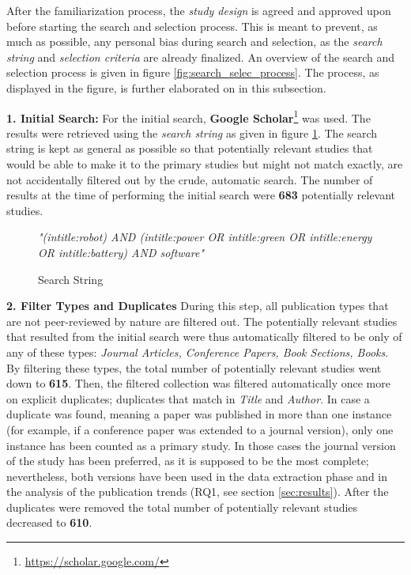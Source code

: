 After the familiarization process, the \textit{study design} is agreed and approved upon before starting the search and selection process. 
This is meant to prevent, as much as possible, any personal bias during search and selection, as the \textit{search string} and \textit{selection criteria} are already finalized.
An overview of the search and selection process is given in figure \ref{fig:search_selec_process}.
The process, as displayed in the figure, is further elaborated on in this subsection.

\vspace{5mm}

\noindent\textbf{1. Initial Search:}
For the initial search, \textbf{Google Scholar}\footnote{\url{https://scholar.google.com/}} was used. The results were retrieved using the \textit{search string} as given in figure \ref{fig:search_string}. 
The search string is kept as general as possible so that potentially relevant studies that would be able to make it to the primary studies but might not match exactly, are not accidentally filtered out by the crude, automatic search.
The number of results at the time of performing the initial search were \textbf{683} potentially relevant studies.

\begin{figure}
    \centering
    \textit{"(intitle:robot) AND (intitle:power OR intitle:green OR intitle:energy OR intitle:battery) AND software"}
    \caption{Search String}
    \label{fig:search_string}
\end{figure}

\noindent\textbf{2. Filter Types and Duplicates}
During this step, all publication types that are not peer-reviewed by nature are filtered out. 
The potentially relevant studies that resulted from the initial search were thus automatically filtered to be only of any of these types: \textit{Journal Articles, Conference Papers, Book Sections, Books}.
By filtering these types, the total number of potentially relevant studies went down to \textbf{615}. 
Then, the filtered collection was filtered automatically once more on explicit duplicates; duplicates that match in \textit{Title} and \textit{Author}.
In case a duplicate was found, meaning a paper was published in more than one instance (for example, if a conference paper was extended to a journal version), only one instance has been counted as a primary study. 
In those cases the journal version of the study has been preferred, as it is supposed to be the most complete; nevertheless, both versions have been used in the data extraction phase and in the analysis of the publication trends (RQ1, see section \ref{sec:results}).
After the duplicates were removed the total number of potentially relevant studies decreased to \textbf{610}.

